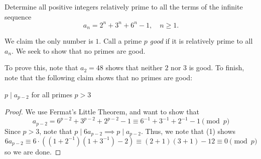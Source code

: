 
\begin{problem}[ISL 2005 N1]
    Determine all positive integers relatively prime to all the terms of the
    infinite sequence \[a_n=2^n+3^n+6^n-1, \quad n \geq 1.\]
\end{problem}

\begin{solution}[Ritwin]
    We claim the only number is $1$. Call a prime $p$ \textit{good} if it is
    relatively prime to all $a_n$. We seek to show that no primes are good.
    
    To prove this, note that $a_2 = 48$ shows that neither $2$ nor $3$ is good.
    To finish, note that the following claim shows that no primes are good:
    
    \begin{claim*}
        $p \mid a_{p-2}$ for all primes $p > 3$
    \end{claim*}
    \begin{proof}
        We use Fermat's Little Theorem, and want to show that
        \[a_{p-2} = 6^{p-2} + 3^{p-2} + 2^{p-2} - 1 \equiv 6^{-1} + 3^{-1} + 2^{-1} - 1 \pmod p \tag{1}\]
        Since $p > 3$, note that $p \mid 6a_{p-2} \implies p \mid a_{p-2}$.
        Thus, we note that (1) shows \[6a_{p-2} \equiv 6 \cdot ((1 + 2^{-1})(1 + 3^{-1}) - 2) \equiv (2 + 1)(3 + 1) - 12 \equiv 0 \pmod p\] so we are done.
    \end{proof}
\end{solution}
